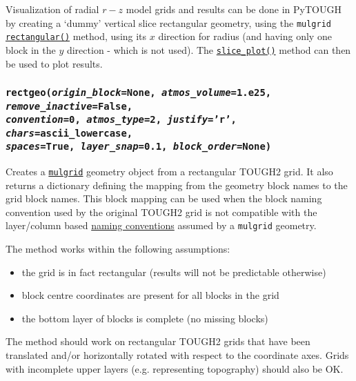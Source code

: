 Visualization of radial $r-z$ model grids and results can be done in PyTOUGH by creating a `dummy' vertical slice rectangular geometry, using the \texttt{mulgrid} \hyperref[sec:mulgrid:rectangular]{\texttt{rectangular()}} method, using its $x$ direction for radius (and having only one block in the $y$ direction - which is not used).  The \hyperref[sec:mulgrid:slice_plot]{\texttt{slice\_plot()}} method can then be used to plot results.

\begin{snugshade}
\subsubsection{\texttt{rectgeo(\emph{origin\_block}=None, \emph{atmos\_volume}=1.e25, \emph{remove\_inactive}=False,\\
    \emph{convention}=0, \emph{atmos\_type}=2, \emph{justify}='r', \emph{chars}=ascii\_lowercase,\\
    \emph{spaces}=\texttt{True}, \emph{layer\_snap}=0.1, \emph{block\_order}=None)}}
\end{snugshade}
\label{sec:t2grid:rectgeo}

Creates a \hyperref[mulgrids]{\texttt{mulgrid}} geometry object from a rectangular TOUGH2 grid. It also returns a dictionary defining the mapping from the geometry block names to the grid block names. This block mapping can be used when the block naming convention used by the original TOUGH2 grid is not compatible with the layer/column based \hyperref[geometry_format_conventions]{naming conventions} assumed by a \texttt{mulgrid} geometry.

The method works within the following assumptions:
\begin{itemize}
  \item the grid is in fact rectangular (results will not be predictable otherwise)
  \item block centre coordinates are present for all blocks in the grid
  \item the bottom layer of blocks is complete (no missing blocks)
\end{itemize}

The method should work on rectangular TOUGH2 grids that have been translated and/or horizontally rotated with respect to the coordinate axes. Grids with incomplete upper layers (e.g. representing topography) should also be OK.

